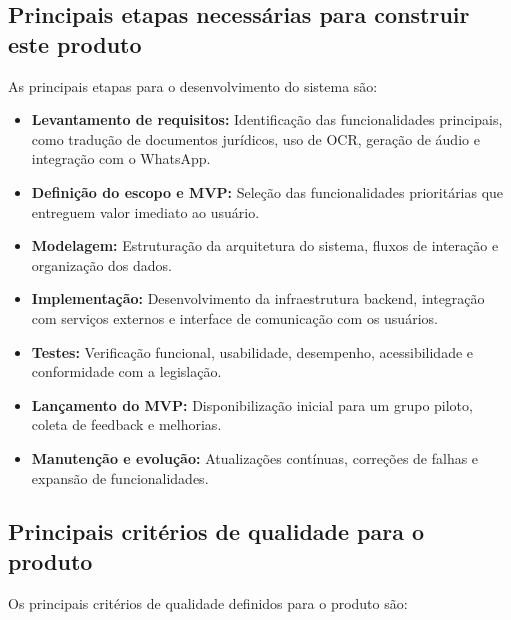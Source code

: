\documentclass{article}
\begin{document}
\subsection{ Principais etapas necessárias para construir este produto}

As principais etapas para o desenvolvimento do sistema são:

\begin{itemize}
    \item \textbf{Levantamento de requisitos:} Identificação das funcionalidades principais, como tradução de documentos jurídicos, uso de OCR, geração de áudio e integração com o WhatsApp.
    \item \textbf{Definição do escopo e MVP:} Seleção das funcionalidades prioritárias que entreguem valor imediato ao usuário.
    \item \textbf{Modelagem:} Estruturação da arquitetura do sistema, fluxos de interação e organização dos dados.
    \item \textbf{Implementação:} Desenvolvimento da infraestrutura backend, integração com serviços externos e interface de comunicação com os usuários.
    \item \textbf{Testes:} Verificação funcional, usabilidade, desempenho, acessibilidade e conformidade com a legislação.
    \item \textbf{Lançamento do MVP:} Disponibilização inicial para um grupo piloto, coleta de feedback e melhorias.
    \item \textbf{Manutenção e evolução:} Atualizações contínuas, correções de falhas e expansão de funcionalidades.
\end{itemize}

\subsection{Principais critérios de qualidade para o produto}

Os principais critérios de qualidade definidos para o produto são:
\end{document}
